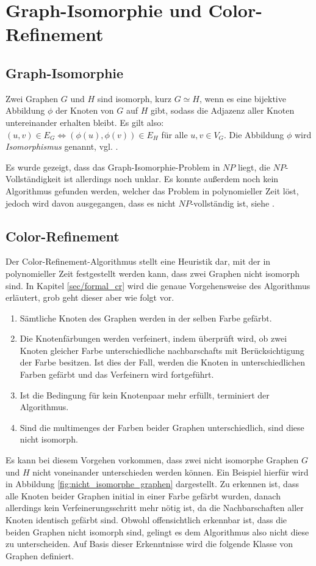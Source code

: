 \section{Graph-Isomorphie und Color-Refinement}
\label{sec/gi_cr}

\subsection{Graph-Isomorphie}
Zwei Graphen $G$ und $H$ sind isomorph, kurz $G\simeq H$, wenn es eine bijektive Abbildung $\phi$ der Knoten von $G$ auf $H$ gibt, sodass die Adjazenz aller Knoten untereinander erhalten bleibt.
Es gilt also: $(u,v)\in E_G\Leftrightarrow (\phi (u),\phi (v))\in E_H$ für alle $u,v\in V_G$.
Die Abbildung $\phi$ wird \emph{Isomorphismus} genannt, vgl. \cite{MCKAY201494}.

Es wurde gezeigt, dass das Graph-Isomorphie-Problem in $NP$ liegt, die $NP$-Vollständigkeit ist allerdings noch unklar.
Es konnte außerdem noch kein Algorithmus gefunden werden, welcher das Problem in polynomieller Zeit löst, jedoch wird davon ausgegangen, dass es nicht $NP$-vollständig ist, siehe \cite{Goldreich1991}.

\subsection{Color-Refinement}
\label{sec/cr}
Der Color-Refinement-Algorithmus stellt eine Heuristik dar, mit der in polynomieller Zeit festgestellt werden kann, dass zwei Graphen nicht isomorph sind.
In Kapitel \ref{sec/formal_cr} wird die genaue Vorgehensweise des Algorithmus erläutert, grob geht dieser aber wie folgt vor.
\begin{enumerate}
	\item Sämtliche Knoten des Graphen werden in der selben Farbe gefärbt.
	\item Die Knotenfärbungen werden verfeinert, indem überprüft wird, ob zwei Knoten gleicher Farbe unterschiedliche \glspl{nachbarschaft} mit Berücksichtigung der Farbe besitzen.
	Ist dies der Fall, werden die Knoten in unterschiedlichen Farben gefärbt und das Verfeinern wird fortgeführt.
	\item Ist die Bedingung für kein Knotenpaar mehr erfüllt, terminiert der Algorithmus.
	\item Sind die \glspl{multimenge} der Farben beider Graphen unterschiedlich, sind diese nicht isomorph.
\end{enumerate}

Es kann bei diesem Vorgehen vorkommen, dass zwei nicht isomorphe Graphen $G$ und $H$ nicht voneinander unterschieden werden können.
Ein Beispiel hierfür wird in Abbildung \ref{fig:nicht_isomorphe_graphen} dargestellt.
Zu erkennen ist, dass alle Knoten beider Graphen initial in einer Farbe gefärbt wurden, danach allerdings kein Verfeinerungsschritt mehr nötig ist, da die Nachbarschaften aller Knoten identisch gefärbt sind.
Obwohl offensichtlich erkennbar ist, dass die beiden Graphen nicht isomorph sind, gelingt es dem Algorithmus also nicht diese zu unterscheiden.
Auf Basis dieser Erkenntnisse wird die folgende Klasse von Graphen definiert.

